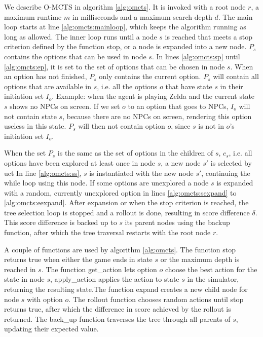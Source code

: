 We describe O-MCTS in algorithm \ref{alg:omcts}. It is invoked with a root node
$r$, a maximum runtime $m$ in milliseconds and a maximum search depth $d$. The
main loop starts at line \ref{alg:omcts:mainloop}, which keeps the algorithm
running as long as allowed. The inner loop runs until a node $s$ is reached
that meets a stop criterion defined by the function \textsf{stop}, or a node is
expanded into a new node. $P_s$ contains the options that can be used in node
$s$. In lines \ref{alg:omcts:sp} until \ref{alg:omcts:ep}, it is set to the set
of options that can be chosen in node $s$. When an option has not finished,
$P_s$ only contains the current option. $P_s$ will contain all
options that are available in $s$, i.e. all the options $o$ that have state $s$
in their initiation set $I_o$. 
Example: when the agent is playing Zelda and the
current state $s$ shows no NPCs on screen. If we set $o$ to an option that goes
to NPCs, $I_o$ will not contain state $s$, because there are no NPCs on
screen, rendering this option useless in this state. $P_s$ will then not contain
option $o$, since $s$ is not in $o$'s initiation set $I_o$.

When the set $P_s$ is the same as the set of options in the children of $s$,
$c_s$, i.e. all options have been explored at least once in node $s$, a new node $s'$ is
selected by \textsf{uct} In line
\ref{alg:omcts:ss}, $s$ is instantiated with the new node $s'$, continuing the
while loop using this node. If some options are unexplored a node $s$ is
expanded with a random, currently unexplored option in lines \ref{alg:omcts:sexpand} to
\ref{alg:omcts:eexpand}. After expansion or when the stop criterion is reached,
the tree selection loop is stopped and a rollout is done, resulting in score
difference $\delta$. This score difference is backed up to $s$ its parent nodes
using the backup function, after which the tree traversal restarts with the root
node $r$.

A couple of functions are used by algorithm \ref{alg:omcts}. The function
\textsf{stop} returns true when either the game ends in state $s$ or the maximum
depth is reached in $s$. The function \textsf{get\_action} lets option $o$
choose the best action for the state in node $s$, \textsf{apply\_action} applies
the action to state $s$ in the simulator, returning the resulting state.The
function \textsf{expand} creates a new child node for node $s$ with option $o$.
The \textsf{rollout} function chooses random actions until \textsf{stop} returns
true, after which the difference in score achieved by the rollout is returned.
The \textsf{back\_up} function traverses the tree through all parents of $s$,
updating their expected value.

